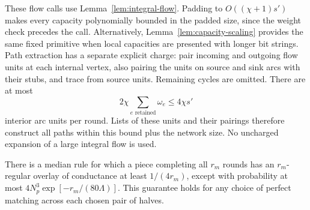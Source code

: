 These flow calls use Lemma~\ref{lem:integral-flow}.  Padding to
$O((\chi+1)s')$ makes every capacity polynomially bounded in the
padded size, since the weight check precedes the call.  Alternatively,
Lemma~\ref{lem:capacity-scaling} provides the same fixed primitive
when local capacities are presented with longer bit strings.  Path
extraction has a separate explicit charge: pair incoming and outgoing
flow units at each internal vertex, also pairing the units on source
and sink arcs with their stubs, and trace from source units.  Remaining
cycles are omitted.  There are at most
\begin{equation}\label{route:flow-throughput}
 2\chi\sum_{e\text{ retained}}\omega_e\le4\chi s'
\end{equation}
interior arc units per round.  Lists of these units and their pairings
therefore construct all paths within this bound plus the network size.
No uncharged expansion of a large integral flow is used.

\begin{lemma}\label{route:overlay}
There is a median rule for which a piece completing all $r_m$ rounds
has an $r_m$-regular overlay of conductance at least $1/(4r_m)$,
except with probability at most
$4N_p^3\exp[-r_m/(80\Lambda)]$.  This guarantee holds for any choice
of perfect matching across each chosen pair of halves.
\end{lemma}

